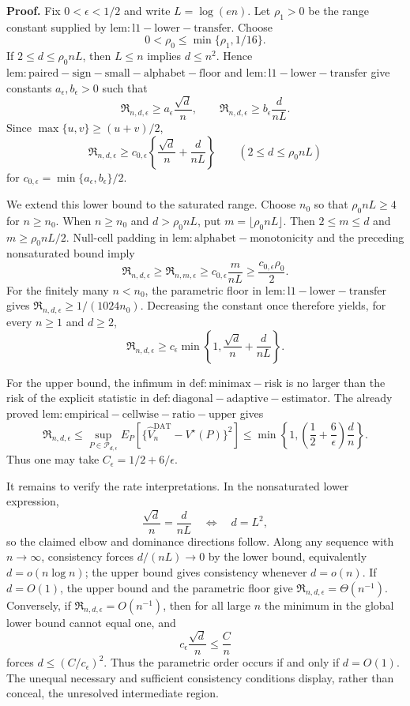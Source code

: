 \textbf{Proof.}
Fix \(0<\epsilon<1/2\) and write \(L=\log(en)\).  Let \(\rho_1>0\) be the range constant supplied by \(\mathrm{lem:l1-lower-transfer}\).  Choose
\[
 0<\rho_0\leq\min\{\rho_1,1/16\}.
\]
If \(2\leq d\leq\rho_0nL\), then \(L\leq n\) implies \(d\leq n^2\).  Hence \(\mathrm{lem:paired-sign-small-alphabet-floor}\) and \(\mathrm{lem:l1-lower-transfer}\) give constants \(a_\epsilon,b_\epsilon>0\) such that
\[
 \mathfrak R_{n,d,\epsilon}
 \geq a_\epsilon\frac{\sqrt d}{n},
 \qquad
 \mathfrak R_{n,d,\epsilon}
 \geq b_\epsilon\frac{d}{nL}.
\]
Since \(\max\{u,v\}\geq(u+v)/2\),
\[
 \mathfrak R_{n,d,\epsilon}
 \geq c_{0,\epsilon}\left\{
    \frac{\sqrt d}{n}+\frac{d}{nL}
 \right\}
 \qquad(2\leq d\leq\rho_0nL)
\]
for \(c_{0,\epsilon}=\min\{a_\epsilon,b_\epsilon\}/2\).

We extend this lower bound to the saturated range.  Choose \(n_0\) so that \(\rho_0nL\geq4\) for \(n\geq n_0\).  When \(n\geq n_0\) and \(d>\rho_0nL\), put \(m=\lfloor\rho_0nL\rfloor\).  Then \(2\leq m\leq d\) and \(m\geq\rho_0nL/2\).  Null-cell padding in \(\mathrm{lem:alphabet-monotonicity}\) and the preceding nonsaturated bound imply
\[
 \mathfrak R_{n,d,\epsilon}
 \geq\mathfrak R_{n,m,\epsilon}
 \geq c_{0,\epsilon}\frac{m}{nL}
 \geq\frac{c_{0,\epsilon}\rho_0}{2}.
\]
For the finitely many \(n<n_0\), the parametric floor in \(\mathrm{lem:l1-lower-transfer}\) gives \(\mathfrak R_{n,d,\epsilon}\geq1/(1024n_0)\).  Decreasing the constant once therefore yields, for every \(n\geq1\) and \(d\geq2\),
\[
 \mathfrak R_{n,d,\epsilon}
 \geq c_\epsilon\min\!\left\{1,
   \frac{\sqrt d}{n}+\frac{d}{nL}
 \right\}.
\]

For the upper bound, the infimum in \(\mathrm{def:minimax-risk}\) is no larger than the risk of the explicit statistic in \(\mathrm{def:diagonal-adaptive-estimator}\).  The already proved \(\mathrm{lem:empirical-cellwise-ratio-upper}\) gives
\[
 \mathfrak R_{n,d,\epsilon}
 \leq\sup_{P\in\mathcal P_{d,\epsilon}}
 E_P\!\left[
  \{\widehat V_n^{\mathrm{DAT}}-V^\star(P)\}^2
 \right]
 \leq\min\!\left\{1,
   \left(\frac12+\frac6\epsilon\right)\frac dn
 \right\}.
\]
Thus one may take \(C_\epsilon=1/2+6/\epsilon\).

It remains to verify the rate interpretations.  In the nonsaturated lower expression,
\[
 \frac{\sqrt d}{n}=\frac{d}{nL}
 \quad\Longleftrightarrow\quad
 d=L^2,
\]
so the claimed elbow and dominance directions follow.  Along any sequence with \(n\to\infty\), consistency forces \(d/(nL)\to0\) by the lower bound, equivalently \(d=o(n\log n)\); the upper bound gives consistency whenever \(d=o(n)\).  If \(d=O(1)\), the upper bound and the parametric floor give \(\mathfrak R_{n,d,\epsilon}=\Theta(n^{-1})\).  Conversely, if \(\mathfrak R_{n,d,\epsilon}=O(n^{-1})\), then for all large \(n\) the minimum in the global lower bound cannot equal one, and
\[
 c_\epsilon\frac{\sqrt d}{n}\leq\frac Cn
\]
forces \(d\leq(C/c_\epsilon)^2\).  Thus the parametric order occurs if and only if \(d=O(1)\).  The unequal necessary and sufficient consistency conditions display, rather than conceal, the unresolved intermediate region.